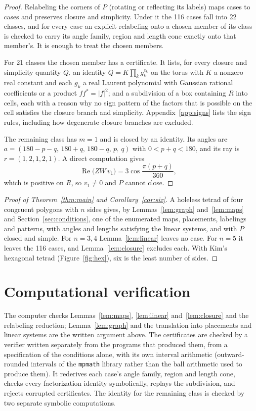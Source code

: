 \documentclass[11pt]{article}
\theoremstyle{definition}
\theoremstyle{remark}
\begin{document}
\begin{proof}
Relabeling the corners of $P$ (rotating or reflecting its labels) maps
cases to cases and preserves closure and simplicity. Under it the 116
cases fall into 22 classes, and for every case an explicit relabeling onto
a chosen member of its class is checked to carry its angle family, region
and length cone exactly onto that member's. It is enough to treat the
chosen members.

For 21 classes the chosen member has a certificate. It lists, for every
closure and simplicity quantity $Q$, an identity $Q=K\prod_kg_k^{e_k}$ on the
torus with $K$ a nonzero real constant and each $g_k$ a real Laurent
polynomial with Gaussian rational coefficients or a product $ff^*=|f|^2$;
and a subdivision of a box containing $R$ into cells, each with a reason why
no sign pattern of the factors that is possible on the cell satisfies the
closure branch and simplicity. Appendix~\ref{app:signs} lists the sign rules, including
how degenerate closure branches are excluded.

The remaining class has $m=1$ and is closed by an identity. Its angles are
$a=(180-p-q,\,180+q,\,180-q,\,p,\,q)$ with $0<p+q<180$, and its ray is
$r=(1,2,1,2,1)$. A direct computation gives
\[
\operatorname{Re}\bigl(ZW\,v_1\bigr)=3\cos\frac{\pi(p+q)}{360},
\]
which is positive on $R$, so $v_1\ne0$ and $P$ cannot close.
\end{proof}

\begin{proof}[Proof of Theorem~\ref{thm:main} and Corollary~\ref{cor:six}]
A holeless tetrad of four congruent polygons with $n$ sides gives, by
Lemmas~\ref{lem:graph} and~\ref{lem:maps} and Section~\ref{sec:conditions},
one of the enumerated maps, placements, labelings and patterns, with angles
and lengths satisfying the linear systems, and with $P$ closed and simple.
For $n=3,4$ Lemma~\ref{lem:linear} leaves no case. For $n=5$ it leaves the
116 cases, and Lemma~\ref{lem:closure} excludes each. With Kim's hexagonal
tetrad (Figure~\ref{fig:hex}), six is the least number of sides.
\end{proof}

\section{Computational verification}\label{sec:verification}

The computer checks Lemmas~\ref{lem:maps}, \ref{lem:linear}
and~\ref{lem:closure} and the relabeling reduction; Lemma~\ref{lem:graph}
and the translation into placements and linear systems are the written
argument above. The certificates are checked by a verifier written
separately from the programs that produced them, from a specification of
the conditions alone, with its own interval arithmetic (outward-rounded
intervals of the \texttt{mpmath} library rather than the ball arithmetic
used to produce them). It rederives each case's angle family, region and
length cone, checks every factorization identity symbolically, replays the
subdivision, and rejects corrupted certificates. The identity for the remaining
class is checked by two separate symbolic computations.
\end{document}
